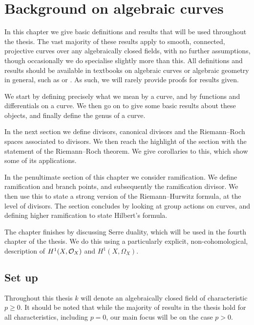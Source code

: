 \chapter{Background on algebraic curves}\label{chapterbackground}

In this chapter we give basic definitions and results that will be used throughout the thesis.
The vast majority of these results apply to smooth, connected, projective curves over any algebraically closed fields, with no further assumptions, though occasionally we do specialise slightly more than this.
All definitions and results should be available in textbooks on algebraic curves or algebraic geometry in general, such as \cite{fulton} or \cite{hart} .
As such, we will rarely provide proofs for results given.

We start by defining precisely what we mean by a curve, and by functions and differentials on a curve.
We then go on to give some basic results about these objects, and finally define the genus of a curve.

In the next section we define divisors, canonical divisors and the Riemann--Roch spaces associated to divisors.
We then reach the highlight of the section with the statement of the Riemann--Roch theorem.
We give corollaries to this, which show some of its applications.

In the penultimate section of this chapter we consider ramification.
We define ramification and branch points, and subsequently the ramification divisor.
We then use this to state a strong version of the Riemann--Hurwitz formula, at the level of divisors.
The section concludes by looking at group actions on curves, and defining higher ramification to state Hilbert's formula.

The chapter finishes by discussing Serre duality, which will be used in the fourth chapter of the thesis.
We do this using a particularly explicit, non-cohomological, description of $H^1(X,\mathcal{O}_X)$ and $H^1(X,\Omega_X)$.


\section{Set up}

Throughout this thesis $k$ will denote an algebraically closed field of characteristic $p \geq 0$.
It should be noted that while the majority of results in the thesis hold for all characteristics, including $p=0$, our main focus will be on the case $p > 0$.

